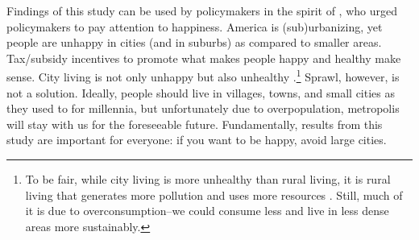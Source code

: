 \documentclass[12pt, letterpaper]{article}
\begin{document}
\begin{spacing}{1.9}
 Findings of this study can be used by policymakers in the spirit of
 \citet{stiglitz09al}, who  urged policymakers to pay attention
 to happiness.  America is (sub)urbanizing,  yet people
 are unhappy in cities (and in suburbs) as compared to smaller areas.
 Tax/subsidy incentives to promote what makes people happy and
 healthy make sense. City living is not only unhappy but also unhealthy \citep[][]{lederbogen11}.\footnote{To be fair, while city living is more
     unhealthy than rural living, it is rural living that generates more
     pollution and uses more resources \citep{meyer13}. Still, much of it is
     due to overconsumption--we could consume less and live in less dense areas
     more sustainably.} Sprawl, however, is not a solution. Ideally, people should
   live in villages, towns, and small cities as they used to for millennia, but
   unfortunately due to overpopulation, metropolis will stay with us for the
   foreseeable future.
 Fundamentally, results from this study are important for everyone: if you want to be
happy, avoid large cities. %



\end{spacing}
\end{document}
